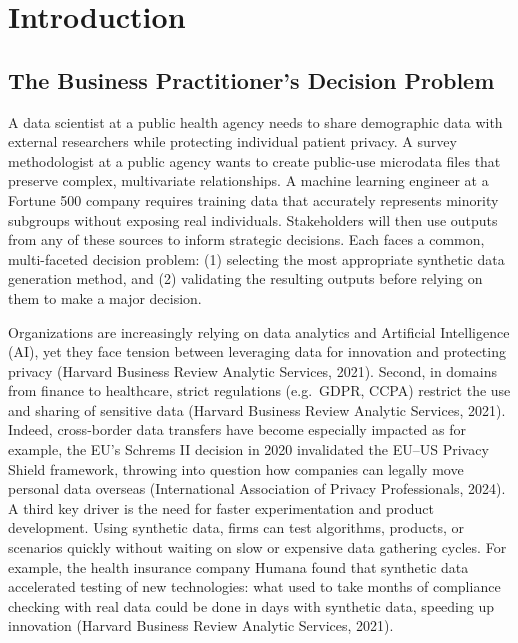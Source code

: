 \documentclass[12pt,a4paper]{article}
\begin{document}
\newpage
\tableofcontents
\newpage

\section{Introduction}

\subsection{The Business Practitioner's Decision Problem}

A data scientist at a public health agency needs to share demographic data with external researchers while protecting individual patient privacy. A survey methodologist at a public agency wants to create public-use microdata files that preserve complex, multivariate relationships. A machine learning engineer at a Fortune 500 company requires training data that accurately represents minority subgroups without exposing real individuals. Stakeholders will then use outputs from any of these sources to inform strategic decisions. Each faces a common, multi-faceted decision problem: (1) selecting the most appropriate synthetic data generation method, and (2) validating the resulting outputs before relying on them to make a major decision.

Organizations are increasingly relying on data analytics and Artificial Intelligence (AI), yet they face tension between leveraging data for innovation and protecting privacy (Harvard Business Review Analytic Services, 2021). Second, in domains from finance to healthcare, strict regulations (e.g.\ GDPR, CCPA) restrict the use and sharing of sensitive data (Harvard Business Review Analytic Services, 2021). Indeed, cross-border data transfers have become especially impacted as for example, the EU's Schrems II decision in 2020 invalidated the EU--US Privacy Shield framework, throwing into question how companies can legally move personal data overseas (International Association of Privacy Professionals, 2024). A third key driver is the need for faster experimentation and product development. Using synthetic data, firms can test algorithms, products, or scenarios quickly without waiting on slow or expensive data gathering cycles. For example, the health insurance company Humana found that synthetic data accelerated testing of new technologies: what used to take months of compliance checking with real data could be done in days with synthetic data, speeding up innovation (Harvard Business Review Analytic Services, 2021).
\end{document}

